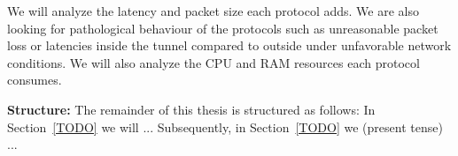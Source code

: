 We will analyze the latency and packet size each protocol adds.
We are also looking for pathological behaviour of the protocols such as unreasonable packet loss or latencies inside the tunnel compared to outside under unfavorable network conditions.
We will also analyze the CPU and RAM resources each protocol consumes.

\noindent\textbf{Structure:}
The remainder of this thesis is structured as follows:
In Section~\ref{TODO} we will ...
Subsequently, in Section~\ref{TODO} we (present tense) ...

